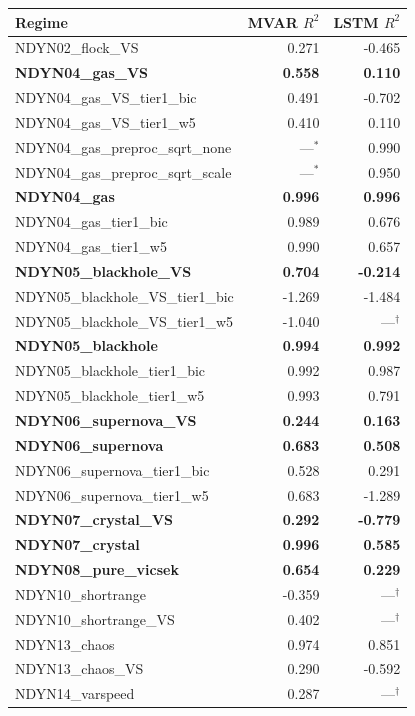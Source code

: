 \begin{minipage}[t]{0.49\textwidth}
\begin{tabular}{@{}lrr@{}}
\hline
Regime & MVAR $R^2$ & LSTM $R^2$ \\
\hline
NDYN02\_flock\_VS & 0.271 & -0.465 \\
\textbf{NDYN04\_gas\_VS} & \textbf{0.558} & \textbf{0.110} \\
NDYN04\_gas\_VS\_tier1\_bic & 0.491 & -0.702 \\
NDYN04\_gas\_VS\_tier1\_w5 & 0.410 & 0.110 \\
NDYN04\_gas\_preproc\_sqrt\_none & ---$^*$ & 0.990 \\
NDYN04\_gas\_preproc\_sqrt\_scale & ---$^*$ & 0.950 \\
\textbf{NDYN04\_gas} & \textbf{0.996} & \textbf{0.996} \\
NDYN04\_gas\_tier1\_bic & 0.989 & 0.676 \\
NDYN04\_gas\_tier1\_w5 & 0.990 & 0.657 \\
\textbf{NDYN05\_blackhole\_VS} & \textbf{0.704} & \textbf{-0.214} \\
NDYN05\_blackhole\_VS\_tier1\_bic & -1.269 & -1.484 \\
NDYN05\_blackhole\_VS\_tier1\_w5 & -1.040 & ---$^\dagger$ \\
\textbf{NDYN05\_blackhole} & \textbf{0.994} & \textbf{0.992} \\
NDYN05\_blackhole\_tier1\_bic & 0.992 & 0.987 \\
NDYN05\_blackhole\_tier1\_w5 & 0.993 & 0.791 \\
\textbf{NDYN06\_supernova\_VS} & \textbf{0.244} & \textbf{0.163} \\
\textbf{NDYN06\_supernova} & \textbf{0.683} & \textbf{0.508} \\
NDYN06\_supernova\_tier1\_bic & 0.528 & 0.291 \\
NDYN06\_supernova\_tier1\_w5 & 0.683 & -1.289 \\
\textbf{NDYN07\_crystal\_VS} & \textbf{0.292} & \textbf{-0.779} \\
\textbf{NDYN07\_crystal} & \textbf{0.996} & \textbf{0.585} \\
\textbf{NDYN08\_pure\_vicsek} & \textbf{0.654} & \textbf{0.229} \\
NDYN10\_shortrange & -0.359 & ---$^\dagger$ \\
NDYN10\_shortrange\_VS & 0.402 & ---$^\dagger$ \\
NDYN13\_chaos & 0.974 & 0.851 \\
NDYN13\_chaos\_VS & 0.290 & -0.592 \\
NDYN14\_varspeed & 0.287 & ---$^\dagger$ \\
\hline
\end{tabular}
\end{minipage}
